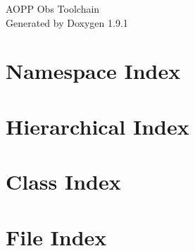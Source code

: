 \let\mypdfximage\pdfximage\def\pdfximage{\immediate\mypdfximage}\documentclass[twoside]{book}
\newcommand{\+}{\discretionary{\mbox{\scriptsize$\hookleftarrow$}}{}{}}
\newcommand{\clearemptydoublepage}{%
  \newpage{\pagestyle{empty}\cleardoublepage}%
}
\begin{document}
\raggedbottom

\hypersetup{pageanchor=false,
             bookmarksnumbered=true,
             pdfencoding=unicode
            }
\begin{titlepage}
\vspace*{7cm}
\begin{centre}%
{\Large AOPP Obs Toolchain }\\
\vspace*{1cm}
{\large Generated by Doxygen 1.9.1}\\
\end{centre}
\end{titlepage}
\clearemptydoublepage
{}
\tableofcontents
\clearemptydoublepage
{}
\hypersetup{pageanchor=true}

\chapter{Namespace Index}

\chapter{Hierarchical Index}

\chapter{Class Index}

\chapter{File Index}

\end{document}

